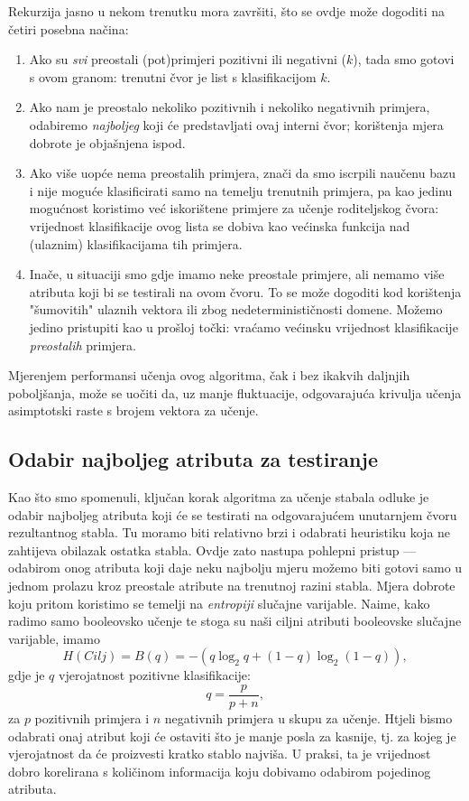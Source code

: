 \documentclass[12pt,a4paper]{article}
\begin{document}
Rekurzija jasno u nekom trenutku mora završiti, što se ovdje može dogoditi na četiri posebna načina:

\begin{enumerate}
    \item Ako su \emph{svi} preostali (pot)primjeri pozitivni ili negativni ($k$), tada smo gotovi s ovom granom: trenutni čvor je list s klasifikacijom $k$.
    \item Ako nam je preostalo nekoliko pozitivnih i nekoliko negativnih primjera, odabiremo \emph{najboljeg} koji će predstavljati ovaj interni čvor;
    korištenja mjera dobrote je objašnjena ispod.
    \item Ako više uopće nema preostalih primjera, znači da smo iscrpili naučenu bazu i nije moguće klasificirati samo na temelju trenutnih primjera,
    pa kao jedinu mogućnost koristimo već iskorištene primjere za učenje roditeljskog čvora: vrijednost klasifikacije ovog lista se dobiva kao većinska
    funkcija nad (ulaznim) klasifikacijama tih primjera.
    \item Inače, u situaciji smo gdje imamo neke preostale primjere, ali nemamo više atributa koji bi se testirali na ovom čvoru. To se može dogoditi
    kod korištenja "šumovitih" ulaznih vektora ili zbog nedeterminističnosti domene. Možemo jedino pristupiti kao u prošloj točki: vraćamo većinsku
    vrijednost klasifikacije \emph{preostalih} primjera.
\end{enumerate}

Mjerenjem performansi učenja ovog algoritma, čak i bez ikakvih daljnjih poboljšanja, može se uočiti da, uz manje fluktuacije,
odgovarajuća krivulja učenja asimptotski raste s brojem vektora za učenje.

\subsection{Odabir najboljeg atributa za testiranje}
Kao što smo spomenuli, ključan korak algoritma za učenje stabala odluke je odabir najboljeg atributa koji će se testirati na
odgovarajućem unutarnjem čvoru rezultantnog stabla. Tu moramo biti relativno brzi i odabrati heuristiku koja ne zahtijeva obilazak
ostatka stabla.
Ovdje zato nastupa pohlepni pristup --- odabirom onog atributa koji daje
neku najbolju mjeru možemo biti gotovi samo u jednom prolazu kroz preostale atribute na trenutnoj razini stabla.
Mjera dobrote koju pritom koristimo se temelji na \emph{entropiji} slučajne varijable. Naime, kako radimo samo booleovsko učenje
te stoga su naši ciljni atributi booleovske slučajne varijable, imamo
\begin{equation*}
    H(Cilj)=B(q)=-(q\log_2q+(1-q)\log_2(1-q)),
\end{equation*}
gdje je $q$ vjerojatnost pozitivne klasifikacije:
\begin{equation*}
    q=\frac{p}{p+n},
\end{equation*}
za $p$ pozitivnih primjera i $n$ negativnih primjera u skupu za učenje. Htjeli bismo odabrati onaj atribut koji će ostaviti što je manje
posla za kasnije, tj. za kojeg je vjerojatnost da će proizvesti kratko stablo najviša. U praksi, ta je vrijednost dobro korelirana
s količinom informacija koju dobivamo odabirom pojedinog atributa.
\end{document}
